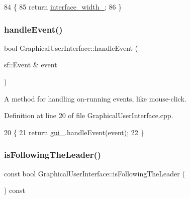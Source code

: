 \begin{DoxyCode}
84                                                           \{
85     \textcolor{keywordflow}{return} \hyperlink{classGraphicalUserInterface_ae3c07ea59e557909f92882028fafb0a3}{interface\_width\_};
86 \}
\end{DoxyCode}
\mbox{\label{classGraphicalUserInterface_a71964c3c49b23a05aa3fd4b4d36aa42d}} 
\subsubsection{\texorpdfstring{handle\+Event()}{handleEvent()}}
{\footnotesize\ttfamily bool Graphical\+User\+Interface\+::handle\+Event (\begin{DoxyParamCaption}\item[{sf\+::\+Event \&}]{event }\end{DoxyParamCaption})}



A method for handling on-\/running events, like mouse-\/click. 



Definition at line 20 of file Graphical\+User\+Interface.\+cpp.


\begin{DoxyCode}
20                                                       \{
21     \textcolor{keywordflow}{return} \hyperlink{classGraphicalUserInterface_ab07abda0fdb8e2965b70d2024fa3cf20}{gui\_}.handleEvent(event);
22 \}
\end{DoxyCode}
\mbox{\label{classGraphicalUserInterface_a9aa8920f70bf99225a7e8e4ff9cb5e3f}} 
\subsubsection{\texorpdfstring{is\+Following\+The\+Leader()}{isFollowingTheLeader()}}
{\footnotesize\ttfamily const bool Graphical\+User\+Interface\+::is\+Following\+The\+Leader (\begin{DoxyParamCaption}{ }\end{DoxyParamCaption}) const}



